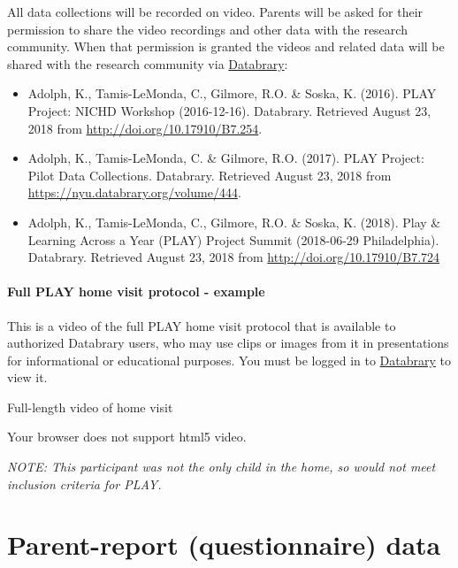 \documentclass[
]{book}
\providecommand{\tightlist}{%
  \setlength{\itemsep}{0pt}\setlength{\parskip}{0pt}}
\begin{document}
All data collections will be recorded on video.
Parents will be asked for their permission to share the video recordings and other data with the research community.
When that permission is granted the videos and related data will be shared with the research community via \href{http://databrary.org}{Databrary}:

\begin{itemize}
\tightlist
\item
  Adolph, K., Tamis-LeMonda, C., Gilmore, R.O. \& Soska, K. (2016). PLAY Project: NICHD Workshop (2016-12-16). Databrary. Retrieved August 23, 2018 from \url{http://doi.org/10.17910/B7.254}.
\item
  Adolph, K., Tamis-LeMonda, C. \& Gilmore, R.O. (2017). PLAY Project: Pilot Data Collections. Databrary. Retrieved August 23, 2018 from \url{https://nyu.databrary.org/volume/444}.
\item
  Adolph, K., Tamis-LeMonda, C., Gilmore, R.O. \& Soska, K. (2018). Play \& Learning Across a Year (PLAY) Project Summit (2018-06-29 Philadelphia). Databrary. Retrieved August 23, 2018 from \url{http://doi.org/10.17910/B7.724}
\end{itemize}

\hypertarget{full-play-home-visit-protocol---example}{%
\paragraph{Full PLAY home visit protocol - example}\label{full-play-home-visit-protocol---example}}

This is a video of the full PLAY home visit protocol that is available to authorized Databrary users, who may use clips or images from it in presentations for informational or educational purposes. You must be logged in to \href{http://databrary.org}{Databrary} to view it.

Full-length video of home visit

\leavevmode{}%
Your browser does not support html5 video.

\emph{NOTE: This participant was not the only child in the home, so would not meet inclusion criteria for PLAY.}

\hypertarget{parent-report-questionnaire-data}{%
\section{Parent-report (questionnaire) data}\label{parent-report-questionnaire-data}}
\end{document}
